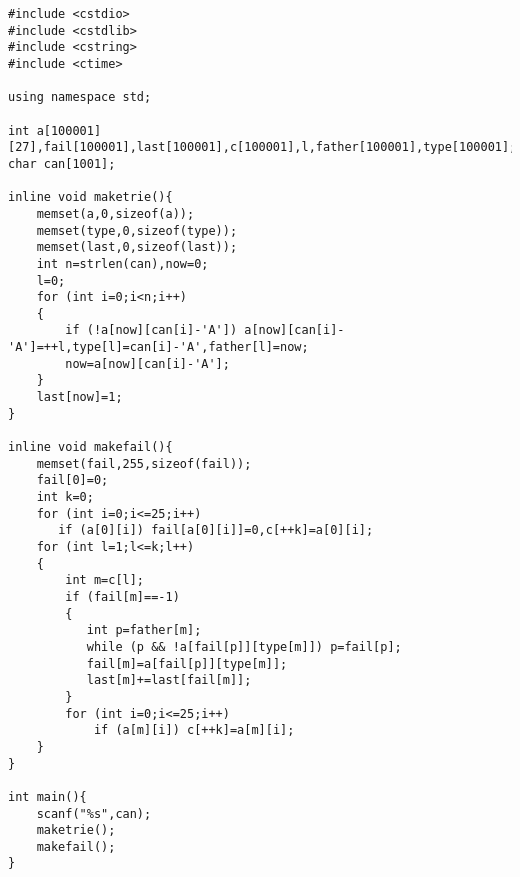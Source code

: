 \begin{lstlisting}
#include <cstdio>
#include <cstdlib>
#include <cstring>
#include <ctime>

using namespace std;

int a[100001][27],fail[100001],last[100001],c[100001],l,father[100001],type[100001];
char can[1001];

inline void maketrie(){
    memset(a,0,sizeof(a));
    memset(type,0,sizeof(type));
    memset(last,0,sizeof(last));
    int n=strlen(can),now=0;
    l=0;
    for (int i=0;i<n;i++) 
    {
        if (!a[now][can[i]-'A']) a[now][can[i]-'A']=++l,type[l]=can[i]-'A',father[l]=now;
        now=a[now][can[i]-'A'];
    }
    last[now]=1;
}

inline void makefail(){
    memset(fail,255,sizeof(fail));
    fail[0]=0;
    int k=0;
    for (int i=0;i<=25;i++) 
       if (a[0][i]) fail[a[0][i]]=0,c[++k]=a[0][i];
    for (int l=1;l<=k;l++)
    {
        int m=c[l];
        if (fail[m]==-1)
        {
           int p=father[m];
           while (p && !a[fail[p]][type[m]]) p=fail[p];
           fail[m]=a[fail[p]][type[m]];
           last[m]+=last[fail[m]];
        }
        for (int i=0;i<=25;i++) 
            if (a[m][i]) c[++k]=a[m][i];
    }
}
         
int main(){ 
    scanf("%s",can);
    maketrie();
    makefail();     
}
\end{lstlisting}
